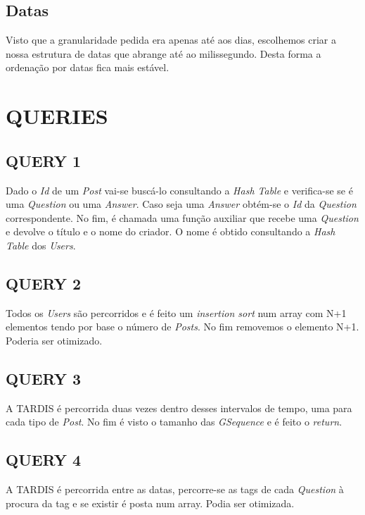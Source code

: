 \documentclass[letterpaper, 10 pt, conference]{IEEEtran}  %
\begin{document}
\subsection{Datas}

Visto que a granularidade pedida era apenas até aos dias, escolhemos criar a nossa estrutura de datas que abrange até ao milissegundo. Desta forma a ordenação por datas fica mais estável.

\section{QUERIES}

\subsection{QUERY 1}

Dado o \textit{Id} de um \textit{Post} vai-se buscá-lo consultando a \textit{Hash Table} e verifica-se se é uma \textit{Question} ou uma \textit{Answer}. Caso seja uma \textit{Answer} obtém-se o \textit{Id} da \textit{Question} correspondente. No fim, é chamada uma função auxiliar que recebe uma \textit{Question} e devolve o título e o nome do criador. O nome é obtido consultando a \textit{Hash Table} dos \textit{Users}.

\subsection{QUERY 2}

Todos os \textit{Users} são percorridos e é feito um \textit{insertion sort} num array com N+1 elementos tendo por base o número de \textit{Posts}. No fim removemos o elemento N+1. Poderia ser otimizado.

\subsection{QUERY 3}

A TARDIS é percorrida duas vezes dentro desses intervalos de tempo, uma para cada tipo de \textit{Post}. No fim é visto o tamanho das \textit{GSequence} e é feito o \textit{return}.

\subsection{QUERY 4}

A TARDIS é percorrida entre as datas, percorre-se as tags de cada \textit{Question} à procura da tag e se existir é posta num array. Podia ser otimizada.
\end{document}

